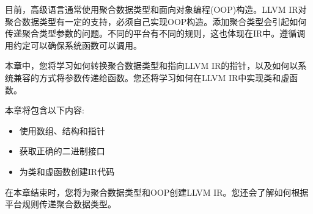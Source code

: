 目前，高级语言通常使用聚合数据类型和面向对象编程(OOP)构造。LLVM IR对聚合数据类型有一定的支持，必须自己实现OOP构造。添加聚合类型会引起如何传递聚合类型参数的问题。不同的平台有不同的规则，这也体现在IR中。遵循调用约定可以确保系统函数可以调用。\par

本章中，您将学习如何转换聚合数据类型和指向LLVM IR的指针，以及如何以系统兼容的方式将参数传递给函数。您还将学习如何在LLVM IR中实现类和虚函数。\par

本章将包含以下内容:\par

\begin{itemize}
\item 使用数组、结构和指针
\item 获取正确的二进制接口
\item 为类和虚函数创建IR代码
\end{itemize}

在本章结束时，您将为聚合数据类型和OOP创建LLVM IR。您还会了解如何根据平台规则传递聚合数据类型。\par































